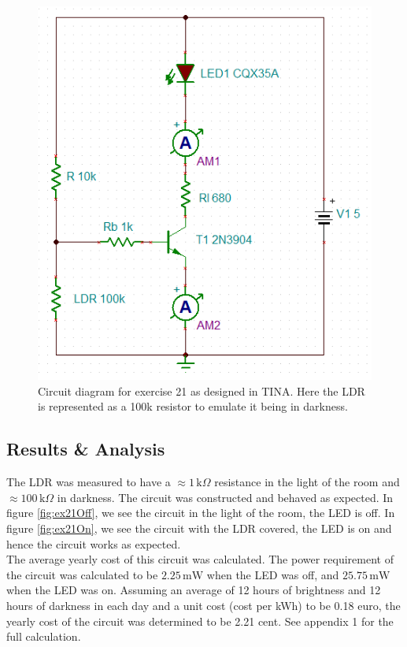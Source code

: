 \documentclass[%
reprint,
amsmath,amssymb,
aps,
floatfix
]{revtex4-2}
\begin{document}
		\begin{figure}
			\includegraphics[width=0.85\columnwidth]{ex21Circuit.png}
			\caption{\label{fig:ex21Circuit}Circuit diagram for exercise 21 as designed in TINA. Here the LDR is represented as a 100k resistor to emulate it being in darkness.}
		\end{figure}
		
		\subsection{Results \& Analysis}
		The LDR was measured to have a $\approx1\,\text{k}\Omega$ resistance in the light of the room and $\approx100\,\text{k}\Omega$ in darkness. The circuit was constructed and behaved as expected. In figure \ref{fig:ex21Off}, we see the circuit in the light of the room, the LED is off. In figure \ref{fig:ex21On}, we see the circuit with the LDR covered, the LED is on and hence the circuit works as expected.\\
		
		The average yearly cost of this circuit was calculated. The power requirement of the circuit was calculated to be $2.25\,\text{mW}$ when the LED was off, and $25.75\,\text{mW}$ when the LED was on. Assuming an average of 12 hours of brightness and 12 hours of darkness in each day and a unit cost (cost per kWh) to be 0.18 euro, the yearly cost of the circuit was determined to be 2.21 cent. See appendix 1 for the full calculation.
		
\end{document}
